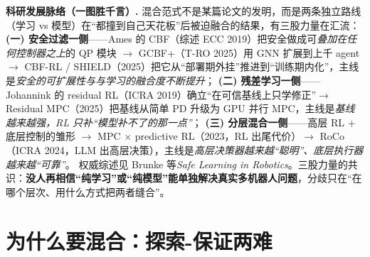 \begin{note}
\textbf{科研发展脉络（一图胜千言）.}\;
混合范式不是某篇论文的发明，而是两条独立路线（学习 vs 模型）在“都撞到自己天花板”后被迫融合的结果，有三股力量在汇流：
\textbf{(一) 安全过滤一侧}——Ames 的 CBF（综述 ECC 2019\cite{ames2019cbf}）把安全做成可\emph{叠加在任何控制器之上}的 QP 模块 $\to$ GCBF+（T-RO 2025\cite{zhang2025gcbfplus}）用 GNN 扩展到上千 agent $\to$ CBF-RL / SHIELD（2025\cite{gandhi2023shield,yin2023shield}）把它从“部署期外挂”推进到“训练期内化”，主线是\emph{安全的可扩展性与与学习的融合度不断提升}；
\textbf{(二) 残差学习一侧}——Johannink 的 residual RL（ICRA 2019\cite{johannink2019residual}）确立“在可信基线上只学修正”$\to$ Residual MPC（2025\cite{residualmpc2025}）把基线从简单 PD 升级为 GPU 并行 MPC，主线是\emph{基线越来越强，RL 只补“模型补不了的那一点”}；
\textbf{(三) 分层混合一侧}——高层 RL $+$ 底层控制的雏形 %
$\to$ MPC $\times$ predictive RL（2023\cite{bjelonic2023mpcrl}，RL 出尾代价）$\to$ RoCo（ICRA 2024\cite{mandi2024roco}，LLM 出高层决策），主线是\emph{高层决策器越来越“聪明”、底层执行器越来越“可靠”}。
权威综述见 Brunke 等\emph{Safe Learning in Robotics}\cite{brunke2022safe}。三股力量的共识：\textbf{没人再相信“纯学习”或“纯模型”能单独解决真实多机器人问题}，分歧只在“在哪个层次、用什么方式把两者缝合”。
\end{note}

\section{为什么要混合：探索-保证两难}
\label{sec:mh-why}

